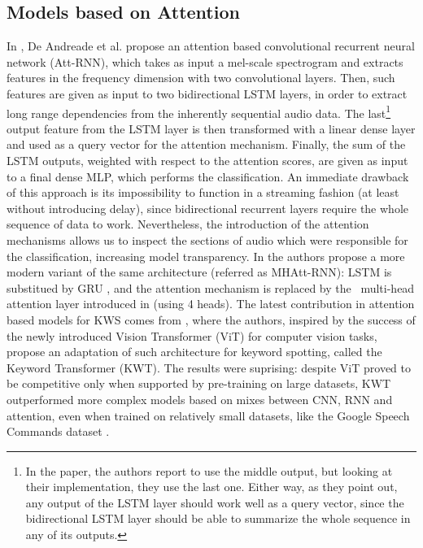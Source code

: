 \subsection{Models based on Attention}
In \cite{attention2018andreade}, De Andreade et al. propose an attention based convolutional recurrent neural network (Att-RNN), which takes as input a mel-scale spectrogram and extracts features in the frequency dimension with two convolutional layers. Then, such features are given as input to two bidirectional LSTM \cite{hochreiter1997long} layers, in order to extract long range dependencies from the inherently sequential audio data. The last\footnote{In the paper, the authors report to use the middle output, but looking at their implementation, they use the last one. Either way, as they point out, any output of the LSTM layer should work well as a query vector, since the bidirectional LSTM layer should be able to summarize the whole sequence in any of its outputs.} output feature from the LSTM layer is then transformed with a linear dense layer and used as a query vector for the attention mechanism. Finally, the sum of the LSTM outputs, weighted with respect to the attention scores, are given as input to a final dense MLP, which performs the classification. An immediate drawback of this approach is its impossibility to function in a streaming fashion (at least without introducing delay), since bidirectional recurrent layers require the whole sequence of data to work. Nevertheless, the introduction of the attention mechanisms allows us to inspect the sections of audio which were responsible for the classification, increasing model transparency. In \cite{streamingkws2020Rybakov} the authors propose a more modern variant of the same architecture (referred as MHAtt-RNN): LSTM is substitued by GRU \cite{Cho2014gru}, and the attention mechanism is replaced by the ~\mbox{multi-head} attention layer introduced in \cite{attentionisall2017vaswani} (using 4 heads). The latest contribution in attention based models for KWS comes from \cite{kwtransformer2021berg}, where the authors, inspired by the success of the newly introduced Vision Transformer (ViT) \cite{vit2020Dosovitskiy} for computer vision tasks, propose an adaptation of such architecture for keyword spotting, called the Keyword Transformer (KWT). The results were suprising: despite ViT proved to be competitive only when supported by pre-training on large datasets, KWT outperformed more complex models based on mixes between CNN, RNN and attention, even when trained on relatively small datasets, like the Google Speech Commands dataset \cite{speechdataset2018warden}.
